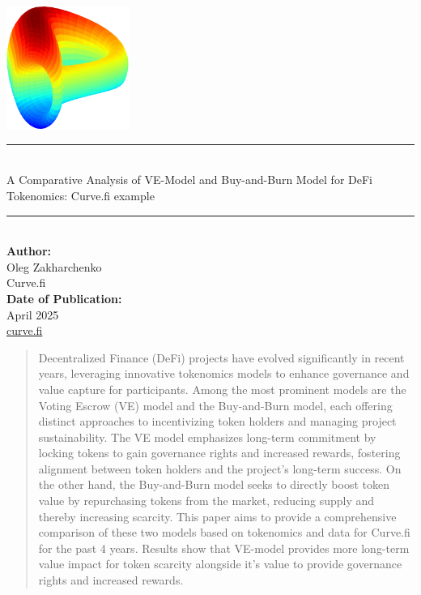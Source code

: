 \documentclass[notitlepage]{revtex4-2}
\begin{document}
    \begin{titlepage}
        \centering
        \includegraphics[width=0.3\textwidth]{images/curve-dao-token-crv-logo}\\[1cm]
        \rule{\textwidth}{0.5mm}\\[0.5cm]
        {\Large A Comparative Analysis of VE-Model and Buy-and-Burn Model for DeFi Tokenomics: Curve.fi example}\\[0.5cm]
        \rule{\textwidth}{0.5mm}\\[1.5cm]

        \textbf{Author:}\\
        Oleg Zakharchenko \\[1cm]
        Curve.fi \\[1cm]

        \vfill
        \textbf{Date of Publication:}\\
        April 2025\\[1cm]

        \href{https://curve.fi}{curve.fi}\\
    \end{titlepage}



\begin{abstract}
    Decentralized Finance (DeFi) projects have evolved significantly in recent years, leveraging innovative tokenomics
    models to enhance governance and value capture for participants.
    Among the most prominent models are the Voting Escrow (VE) model and the Buy-and-Burn model, each offering distinct
    approaches to incentivizing token holders and managing project sustainability.
    The VE model emphasizes long-term commitment by locking tokens to gain governance rights and increased rewards,
    fostering alignment between token holders and the project’s long-term success.
    On the other hand, the Buy-and-Burn model seeks to directly boost token value by repurchasing tokens from the market,
    reducing supply and thereby increasing scarcity.
    This paper aims to provide a comprehensive comparison of these two models based on tokenomics and data for Curve.fi
    for the past 4 years.
    Results show that VE-model provides more long-term value impact for token scarcity alongside it's value to provide
    governance rights and increased rewards.
\end{abstract}
\end{document}
